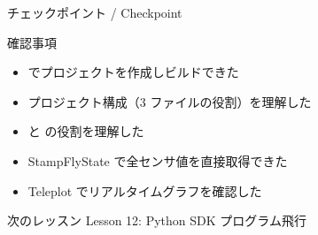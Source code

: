 \documentclass[aspectratio=169, 14pt]{beamer}
\begin{document}
\begin{frame}{チェックポイント / Checkpoint}
  \begin{alertblock}{確認事項}
    \begin{itemize}
      \item[$\square$]  でプロジェクトを作成しビルドできた
      \item[$\square$] プロジェクト構成（3 ファイルの役割）を理解した
      \item[$\square$]  と  の役割を理解した
      \item[$\square$] StampFlyState で全センサ値を直接取得できた
      \item[$\square$] Teleplot でリアルタイムグラフを確認した
    \end{itemize}
  \end{alertblock}

  \vspace{0.5em}

  \begin{block}{次のレッスン}
    Lesson 12: Python SDK プログラム飛行
  \end{block}
\end{frame}
\end{document}
